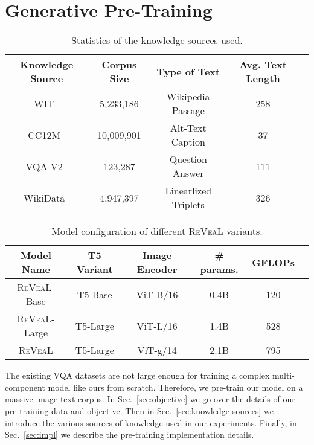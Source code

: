 \documentclass[10pt,twocolumn,letterpaper]{article}
\newcommand{\method}{R\textsc{e}V\textsc{ea}L\xspace}
\begin{document}
%
 \section{Generative Pre-Training}\label{sec:training}
{ \setlength\tabcolsep{2pt} 
\begin{table}[t!]
\centering
\footnotesize
\begin{tabular}{c|cccc} \toprule
Knowledge Source & Corpus Size & Type of Text & Avg. Text Length  \\ \midrule
WIT~\cite{DBLP:conf/sigir/Srinivasan0CBN21} & 5,233,186 & Wikipedia Passage & 258 \\
CC12M~\cite{changpinyo2021cc12m} & 10,009,901& Alt-Text Caption & 37  \\ 
VQA-V2~\cite{DBLP:journals/ijcv/GoyalKASBP19} & 123,287 & Question Answer & 111 \\ 
WikiData~\cite{DBLP:journals/cacm/VrandecicK14} & 4,947,397& Linearlized Triplets & 326  \\
\bottomrule
\end{tabular}
\caption{Statistics of the knowledge sources used.}
\label{tab:kb}
\end{table}
}



{ \setlength\tabcolsep{2pt} 
\begin{table}[t!]
\centering
\footnotesize
\begin{tabular}{c|ccc|cc} \toprule
Model Name & T5 Variant & Image Encoder &\# params. & GFLOPs \\ \midrule
\method-Base & T5-Base  & ViT-B/16 &  0.4B & 120 \\ 
\method-Large & T5-Large & ViT-L/16  & 1.4B & 528 \\ 
\method & T5-Large & ViT-g/14  &  2.1B & 795\\ \bottomrule
\end{tabular}
    \vspace{-.1in}
\caption{Model configuration of different \method variants.}
\label{tab:variant}
\end{table}
}




The existing VQA datasets are not large enough for training a complex multi-component model like ours from scratch. Therefore, we pre-train our model on a massive image-text corpus. 
In Sec.~\ref{sec:objective} we go over the details of our pre-training data and objective. Then in Sec.~\ref{sec:knowledge-sources} we introduce the various sources of knowledge used in our experiments. Finally, in Sec.~\ref{sec:impl} we describe the pre-training implementation details.
\end{document}
